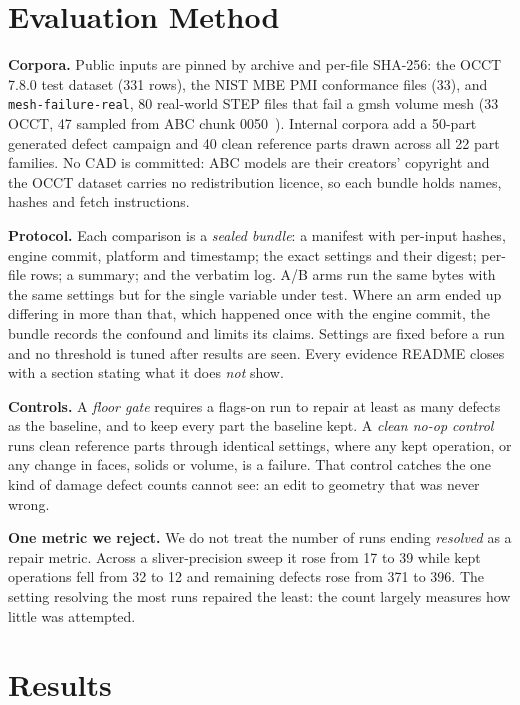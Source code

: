 \documentclass[10pt,onecolumn]{article}
\newcommand{\topic}[1]{\textbf{#1.}\hspace{0.5em}\ignorespaces}
\newcommand{\code}[1]{\texttt{\small #1}}
\begin{document}
\section{Evaluation Method}\label{sec:method}

\topic{Corpora} Public inputs are pinned by archive and per-file SHA-256: the OCCT 7.8.0 test
dataset (331 rows), the NIST MBE PMI conformance files (33), and \code{mesh-failure-real}, 80
real-world STEP files that fail a gmsh volume mesh (33 OCCT, 47 sampled from ABC chunk
0050~\cite{abc}). Internal corpora add a 50-part generated defect campaign and 40 clean reference
parts drawn across all 22 part families. No CAD is committed: ABC models are their creators'
copyright and the OCCT dataset carries no redistribution licence, so each bundle holds names, hashes
and fetch instructions.

\topic{Protocol} Each comparison is a \emph{sealed bundle}: a manifest with per-input hashes, engine
commit, platform and timestamp; the exact settings and their digest; per-file rows; a summary; and
the verbatim log. A/B arms run the same bytes with the same settings but for the single variable
under test. Where an arm ended up differing in more than that, which happened once with the engine
commit, the bundle records the confound and limits its claims. Settings are fixed before a
run and no threshold is tuned after results are seen. Every evidence README closes with a section
stating what it does \emph{not} show.

\topic{Controls} A \emph{floor gate} requires a flags-on run to repair at least as many defects as
the baseline, and to keep every part the baseline kept. A \emph{clean no-op control} runs clean
reference parts through identical settings, where any kept operation, or any change in faces, solids
or volume, is a failure. That control catches the one kind of damage defect counts cannot see: an
edit to geometry that was never wrong.

\topic{One metric we reject} We do not treat the number of runs ending \emph{resolved} as a repair
metric. Across a sliver-precision sweep it rose from 17 to 39 while kept operations fell from 32 to
12 and remaining defects rose from 371 to 396. The setting resolving the most runs repaired the
least: the count largely measures how little was attempted.

\section{Results}\label{sec:results}
\end{document}
